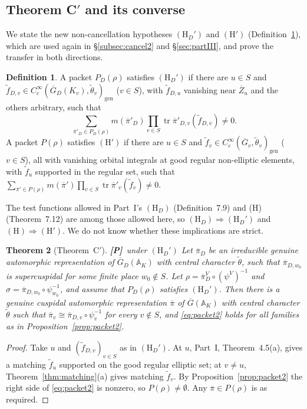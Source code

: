 \documentclass[12pt]{article}
\newcommand{\ov}[1]{\overline{#1}}
\newcommand{\A}{\mathbb{A}}
\newcommand{\gen}{\mathrm{gen}}
\newcommand{\tr}{\operatorname{tr}}
\newcommand{\Gb}{\ov{G}}
\newcommand{\Zb}{\ov{Z}}
\newcommand{\GDb}{\ov{G}_D}
\newcommand{\pib}{\ov{\pi}}
\newcommand{\Pv}{\textbf{[P]}}
\theoremstyle{plain}
\newtheorem{theorem}{Theorem}[section]
\theoremstyle{definition}
\newtheorem{definition}[theorem]{Definition}
\begin{document}
\subsection{Theorem C$'$ and its converse}\label{subsec:Cprime}
We state the new non-cancellation hypotheses $(\mathrm H_D')$ and $(\mathrm H')$ (Definition~\ref{def:HDprime}), which are used again in \S\ref{subsec:cancel2} and \S\ref{sec:partIII}, and prove the transfer in both directions.

\begin{definition}\label{def:HDprime}
A packet $P_D(\rho)$ satisfies $(\mathrm H_D')$ if there are $u\in S$ and $\tilde f_{D,v}\in C_c^\infty(\GDb(K_v),\tilde\theta_v)_\gen$ ($v\in S$), with $\tilde f_{D,u}$ vanishing near $\Zb_u$ and the others arbitrary, such that
\[ \sum_{\pib'_D\in P_D(\rho)}m(\pib'_D)\prod_{v\in S}\tr\pib'_{D,v}(\tilde f_{D,v})\neq0 . \]
A packet $P(\rho)$ satisfies $(\mathrm H')$ if there are $u\in S$ and $\tilde f_v\in C_c^\infty(\Gb_v,\tilde\theta_v)_\gen$ ($v\in S$), all with vanishing orbital integrals at good regular non-elliptic elements, with $\tilde f_u$ supported in the regular set, such that $\sum_{\pib'\in P(\rho)}m(\pib')\prod_{v\in S}\tr\pib'_v(\tilde f_v)\ne0$.
\end{definition}

The test functions allowed in Part~I's $(\mathrm H_D)$ (Definition~7.9) and (H) (Theorem~7.12) are among those allowed here, so $(\mathrm H_D)\Rightarrow(\mathrm H_D')$ and $(\mathrm H)\Rightarrow(\mathrm H')$. We do not know whether these implications are strict.

\begin{theorem}[Theorem~C$'$]\label{thm:Cprime}\Pv\ under $(\mathrm H_D')$
Let $\pib_D$ be an irreducible genuine automorphic representation of $\GDb(\A_K)$ with central character $\tilde\theta$, such that $\pib_{D,w_0}$ is supercuspidal for some finite place $w_0\notin S$. Let $\rho=\pib_D^V\circ(\psi^V)^{-1}$ and $\sigma=\pib_{D,w_0}\circ\psi_{w_0}^{-1}$, and assume that $P_D(\rho)$ satisfies $(\mathrm H_D')$. Then there is a genuine cuspidal automorphic representation $\pib$ of $\Gb(\A_K)$ with central character $\tilde\theta$ such that $\pib_v\cong\pib_{D,v}\circ\psi_v^{-1}$ for every $v\notin S$, and \eqref{eq:packet2} holds for all families as in Proposition~\ref{prop:packet2}.
\end{theorem}
\begin{proof}
Take $u$ and $(\tilde f_{D,v})_{v\in S}$ as in $(\mathrm H_D')$. At $u$, Part~I, Theorem~4.5(a), gives a matching $\tilde f_u$ supported on the good regular elliptic set; at $v\ne u$, Theorem~\ref{thm:matching}(a) gives matching $\tilde f_v$. By Proposition~\ref{prop:packet2} the right side of \eqref{eq:packet2} is nonzero, so $P(\rho)\ne\emptyset$. Any $\pib\in P(\rho)$ is as required.
\end{proof}
\end{document}
